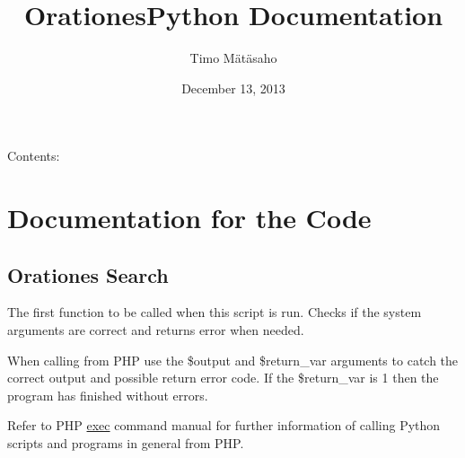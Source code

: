 \documentclass[letterpaper,10pt,english]{sphinxmanual}
\title{OrationesPython Documentation}
\date{December 13, 2013}
\author{Timo Mätäsaho}
\begin{document}
\maketitle
\tableofcontents
{}\label{index::doc}


Contents:


\chapter{Documentation for the Code}
\label{code::doc}\label{code:documentation-for-the-code}\label{code:welcome-to-orationespython-s-documentation}

\section{Orationes Search}
\label{code:module-osearch}\label{code:orationes-search}

\begin{fulllineitems}
\label{code:osearch.init}
The first function to be called when this script is run. Checks if the system arguments are correct 
and returns error when needed.

When calling from PHP use the \$output and \$return\_var arguments to catch the correct output and 
possible return error code. If the \$return\_var is 1 then the program has finished without errors.

Refer to PHP \href{http://php.net/function.exec}{exec} command manual for further information of calling 
Python scripts and programs in general from PHP.

\end{fulllineitems}

\end{document}
